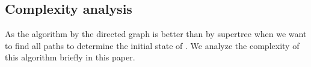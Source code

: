 \subsection{Complexity analysis}
As the algorithm by the directed graph is better than by supertree when we want to find all paths to determine the initial state of \BCNs. We analyze the complexity of this algorithm briefly in this paper. 
